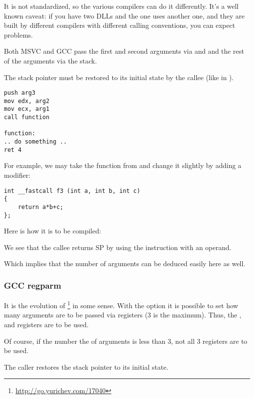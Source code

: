 It is not standardized, so the various compilers can do it differently.
It's a well known caveat: if you have two DLLs and the one uses another one, and they are built by different compilers with 
different  calling conventions, you can expect problems.

Both MSVC and GCC pass the first and second arguments via \ECX and \EDX and the rest of the arguments via the stack.

The \gls{stack pointer} must be restored to its initial state by the \gls{callee} (like in ).

\begin{lstlisting}[caption=fastcall,style=customasmx86]
push arg3
mov edx, arg2
mov ecx, arg1
call function

function:
.. do something ..
ret 4
\end{lstlisting}

For example, we may take the function from  and change it slightly by adding a  modifier:

\begin{lstlisting}[style=customc]
int __fastcall f3 (int a, int b, int c)
{
	return a*b+c;
};
\end{lstlisting}

Here is how it is to be compiled:



We see that the \gls{callee} returns \ac{SP} by using the  instruction with an operand.

Which implies that the number of arguments can be deduced easily here as well.

\subsubsection{GCC regparm}

\newcommand{\URLREGPARMM}{\url{http://go.yurichev.com/17040}}

It is the evolution of \footnote{\URLREGPARMM} in some sense.
With the  option it is possible to set how many arguments are to be passed via registers (3 is the maximum).
Thus, the \EAX, \EDX and \ECX registers are to be used.

Of course, if the number the of arguments is less than 3, not all 3 registers are to be used.

The \gls{caller} restores the \gls{stack pointer} to its initial state.

